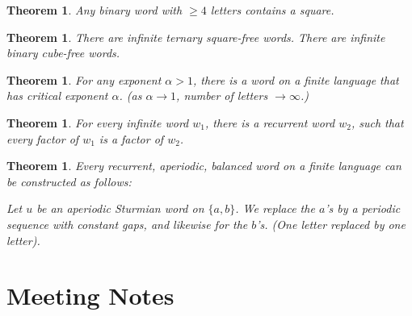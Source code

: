 \documentclass{article}
\theoremstyle{definition}
\theoremstyle{remark}
\theoremstyle{remark}
\theoremstyle{plain}
\newtheorem{theorem}[definition]{Theorem}
\theoremstyle{definition}
\begin{document}
\begin{theorem}
Any binary word with $\ge 4$ letters contains a square.
\end{theorem}

\begin{theorem}
There are infinite ternary square-free words. There are infinite binary cube-free words.
\end{theorem}

\begin{theorem}
For any exponent $\alpha > 1$, there is a word on a finite language that has critical exponent $\alpha$. (as $\alpha \to 1$, number of letters $\to \infty$.)
\end{theorem}

\begin{theorem}
For every infinite word $w_1$, there is a recurrent word $w_2$, such that every factor of $w_1$ is a factor of $w_2$.
\end{theorem}

\begin{theorem}
Every recurrent, aperiodic, balanced word on a finite language can be constructed as follows:

Let $u$ be an aperiodic Sturmian word on $\{a,b\}$. We replace the $a$'s by a periodic sequence with constant gaps, and likewise for the $b$'s.
(One letter replaced by one letter).
\end{theorem}
\section{Meeting Notes}
\end{document}

